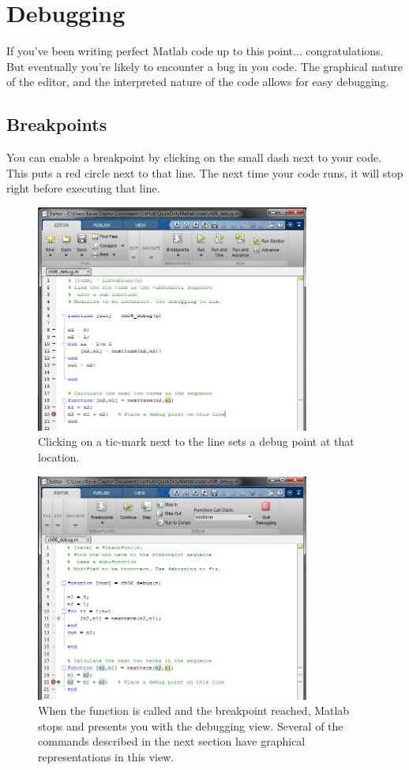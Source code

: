 
\pagebreak
\section{Debugging}
If you've been writing perfect Matlab code up to this point... congratulations.
 But eventually you're likely to encounter a bug in you code.
 The graphical nature of the editor, and the interpreted nature of the code allows for easy debugging.

\subsection{Breakpoints}
You can enable a breakpoint by clicking on the small dash next to your code.
 This puts a red circle next to that line.
 The next time your code runs, it will stop right before executing that line.

\begin{figure}[ht!]
\centering
\includegraphics[width=90mm]{img/debug1.png}
\caption{Clicking on a tic-mark next to the line sets a debug point at that location.}
\label{guiload}
\end{figure}

\begin{figure}[ht!]
\centering
\includegraphics[width=90mm]{img/debug2.png}
\caption{When the function is called and the breakpoint reached, Matlab stops and presents you with the debugging view. Several of the commands described in the next section have graphical representations in this view.}
\label{guiload}
\end{figure}

